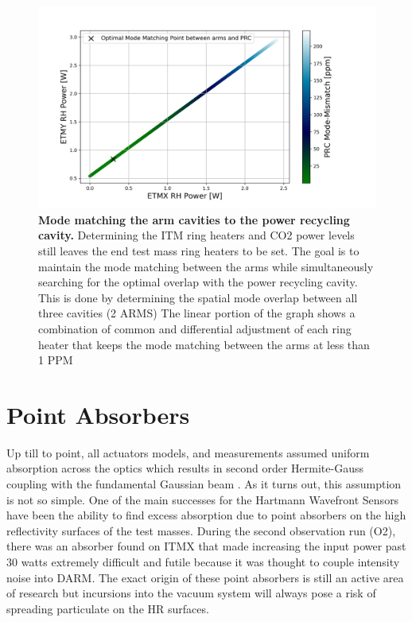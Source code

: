	\begin{figure}[!]
		\centering
		\includegraphics[width=1.0 \textwidth]{../Figures/ETM_TCS_Settings.png}
		\caption[Mode matching the arm cavities to the power recycling cavity.]{
			\textbf{Mode matching the arm cavities to the power recycling cavity.}  Determining the ITM ring heaters and CO2 power levels still leaves the end test mass ring heaters to be set.  The goal is to maintain the mode matching between the arms while simultaneously searching for the optimal overlap with the power recycling cavity.  This is done by determining the spatial mode overlap between all three cavities (2 ARMS) The linear portion of the graph shows a combination of common and differential adjustment of each ring heater that keeps the mode matching between the arms at less than 1 PPM 
		}
		\label{fig:TCS_ETM}
	\end{figure}
	
\section{Point Absorbers}\label{sec:point_absorbers}
	Up till to point, all actuators models, and measurements assumed uniform absorption across the optics which results in second order Hermite-Gauss coupling with the fundamental Gaussian beam .  As it turns out, this assumption is not so simple. One of the main successes for the Hartmann Wavefront Sensors have been the ability to find excess absorption due to point absorbers on the high reflectivity surfaces of the test masses.  During the second observation run (O2), there was an absorber found on ITMX that made increasing the input power past 30 watts extremely difficult and futile because it was thought to couple intensity noise into DARM. The exact origin of these point absorbers is still an active area of research but incursions into the vacuum system will always pose a risk of spreading particulate on the HR surfaces.

